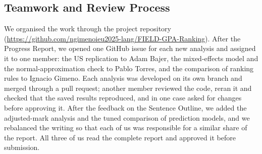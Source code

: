 
\subsection*{Teamwork and Review Process}

We organised the work through the project repository (\url{https://github.com/ngimenoieu2025-lang/FIELD-GPA-Ranking}). After the Progress Report, we opened one GitHub issue for each new analysis and assigned it to one member: the US replication to Adam Bajer, the mixed-effects model and the normal-approximation check to Pablo Torres, and the comparison of ranking rules to Ignacio Gimeno. Each analysis was developed on its own branch and merged through a pull request; another member reviewed the code, reran it and checked that the saved results reproduced, and in one case asked for changes before approving it. After the feedback on the Sentence Outline, we added the adjusted-mark analysis and the tuned comparison of prediction models, and we rebalanced the writing so that each of us was responsible for a similar share of the report. All three of us read the complete report and approved it before submission.
